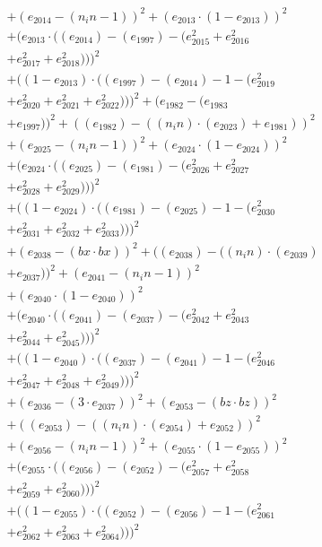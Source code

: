 \documentclass[10pt, a4paper]{article}
\begin{document}
\begin{align*}
& + (e_{2014} - (n_in - 1))^{2} + (e_{2013}  \cdot  (1 - e_{2013}))^{2} \\
& + (e_{2013}  \cdot  ((e_{2014}) - (e_{1997}) - (e_{2015}^{2} + e_{2016}^{2} \\
& + e_{2017}^{2} + e_{2018}^{2})))^{2} \\
& + ((1 - e_{2013})  \cdot  ((e_{1997}) - (e_{2014}) - 1 - (e_{2019}^{2} \\
& + e_{2020}^{2} + e_{2021}^{2} + e_{2022}^{2})))^{2} + (e_{1982} - (e_{1983} \\
& + e_{1997}))^{2} + ((e_{1982}) - ((n_in)  \cdot  (e_{2023}) + e_{1981}))^{2} \\
& + (e_{2025} - (n_in - 1))^{2} + (e_{2024}  \cdot  (1 - e_{2024}))^{2} \\
& + (e_{2024}  \cdot  ((e_{2025}) - (e_{1981}) - (e_{2026}^{2} + e_{2027}^{2} \\
& + e_{2028}^{2} + e_{2029}^{2})))^{2} \\
& + ((1 - e_{2024})  \cdot  ((e_{1981}) - (e_{2025}) - 1 - (e_{2030}^{2} \\
& + e_{2031}^{2} + e_{2032}^{2} + e_{2033}^{2})))^{2} \\
& + (e_{2038} - (bx  \cdot  bx))^{2} + ((e_{2038}) - ((n_in)  \cdot  (e_{2039}) \\
& + e_{2037}))^{2} + (e_{2041} - (n_in - 1))^{2} \\
& + (e_{2040}  \cdot  (1 - e_{2040}))^{2} \\
& + (e_{2040}  \cdot  ((e_{2041}) - (e_{2037}) - (e_{2042}^{2} + e_{2043}^{2} \\
& + e_{2044}^{2} + e_{2045}^{2})))^{2} \\
& + ((1 - e_{2040})  \cdot  ((e_{2037}) - (e_{2041}) - 1 - (e_{2046}^{2} \\
& + e_{2047}^{2} + e_{2048}^{2} + e_{2049}^{2})))^{2} \\
& + (e_{2036} - (3  \cdot  e_{2037}))^{2} + (e_{2053} - (bz  \cdot  bz))^{2} \\
& + ((e_{2053}) - ((n_in)  \cdot  (e_{2054}) + e_{2052}))^{2} \\
& + (e_{2056} - (n_in - 1))^{2} + (e_{2055}  \cdot  (1 - e_{2055}))^{2} \\
& + (e_{2055}  \cdot  ((e_{2056}) - (e_{2052}) - (e_{2057}^{2} + e_{2058}^{2} \\
& + e_{2059}^{2} + e_{2060}^{2})))^{2} \\
& + ((1 - e_{2055})  \cdot  ((e_{2052}) - (e_{2056}) - 1 - (e_{2061}^{2} \\
& + e_{2062}^{2} + e_{2063}^{2} + e_{2064}^{2})))^{2} \\

\end{align*}
\end{document}
